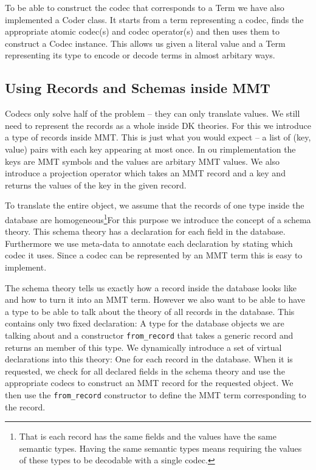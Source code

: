 \documentclass{deliverablereport}
\begin{document}
To be able to construct the codec that corresponds to a Term we have also implemented a Coder class. It starts from a term representing a codec, finds the appropriate atomic codec(s) and codec operator(s) and then uses them to construct a Codec instance. This allows us given a literal value  and a Term representing its type to encode or decode terms in almost arbitary ways.

\subsection{Using Records and Schemas inside MMT}

Codecs only solve half of the problem -- they can only translate values. We still need to represent the records as a whole inside DK theories. For this we introduce a type of records inside MMT. This is just what you would expect -- a list of (key, value) pairs with each key appearing at most once. In ou rimplementation the keys are MMT symbols and the values are arbitary MMT values. We also introduce a projection operator which takes an MMT record and a key and returns the values of the key in the given record.

To translate the entire object, we assume that the records of one type inside the database are homogeneous\footnote{That is each record has the same fields and the values have the same semantic types. Having the same semantic types means requiring the values of these types to be decodable with a single codec. }For this purpose we introduce the concept of a schema theory. This schema theory has a declaration for each field in the database. Furthermore we use meta-data to annotate each declaration by stating which codec it uses. Since a codec can be represented by an MMT term this is easy to implement.

The schema theory tells us exactly how a record inside the database looks like and how to turn it into an MMT term. However we also want to be able to have a type to be able to talk about the theory of all records in the database. This contains only two fixed declaration: A type for the database objects we are talking about and a constructor \texttt{from\_record} that takes a generic record and returns an member of this type. We dynamically introduce a set of virtual declarations into this theory: One for each record in the database. When it is requested, we check for all declared fields in the schema theory and use the appropriate codecs to construct an MMT record for the requested object. We then use the  \texttt{from\_record} constructor to define the MMT term corresponding to the record.
\end{document}
